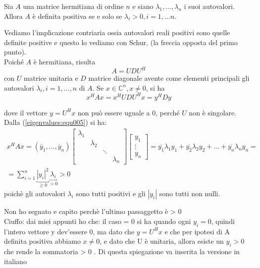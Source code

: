 \begin{theo}
\label{eigenvalues:theo006}
 Sia $A$ una matrice hermitiana di ordine $n$ e siano
$\lambda_1, \ldots, \lambda_n$ i suoi autovalori. Allora
$A$ \`e definita positiva se e solo se $\lambda_i > 0, i =1, \ldots n$.
\end{theo}
\begin{thproof}
Vediamo l'implicazione contriaria ossia
autovalori reali positivi sono quelle definite positive
e questo lo vediamo con Schur. (la freccia opposta del primo punto). \\
Poich\'e $A$  \`e hermitiana, risulta
$$ A = UDU^{H}$$ 
con $U$ matrice unitaria e $D$ matrice diagonale avente come elementi principali
gli autovalori $\lambda_i, i=1, \ldots,n$ di $A$. Se $x \in \mathbb{C}^{n}, x \neq 0$,
si ha
\begin{equation}
\label{eigenvalues:equ005}
x^{H} A x = x^{H}UDU^{H}x = y^{H}Dy 
\end{equation}

dove il vettore $y = U^{H}x$ non può essere uguale a $0$, perch\'e $U$
non \`e singolare. Dalla (\ref{eigenvalues:equ005}) si ha:
$$ 
\begin{array}{c}
x^{H}Ax = (\overline{y}_1, \ldots, \overline{y}_n)
 \left[
\begin{array}{cccc}
\lambda_1 & & &  \\
& \lambda_2 & &  \\
 & & \ddots &  \\
 & &  & \lambda_n 
\end{array}
\right]
\left[
\begin{array}{c}
y_1 \\
\vdots \\
y_n
\end{array}
\right]
 = \overline{y_{1}}\lambda_1 y_1 + \overline{y_{2}}\lambda_2 y_2 +
   \ldots + \overline{y_{n}}\lambda_n y_n = \\
 = \displaystyle \sum_{i=1}^{n} \underbracket{|y_i|^{2}}_{\geq 0} \underbracket{\lambda_{i}}_{>0}
 > 0
\end{array}
$$
poich\`e gli autovalori $\lambda_i$ sono tutti positivi e gli $|y_i|$
sono tutti non nulli.
\begin{notes} 

 Non ho segnato e capito perch\`e l'ultimo passaggetto \`e > 0 \\
Ciuffo: dai miei appunti ho che:  il caso = 0 si ha quando ogni $y_{i} = 0$,
quindi l'intero vettore y dev'essere 0, 
ma dato che $ y=U^{H}x $ e che per ipotesi di A definita positiva abbiamo
 $ x \neq 0 $, e dato che U \`e unitaria, 
allora esiste un $ y_i > 0 $ che rende la sommatoria > 0 .
Di questa spiegazione va inserita la versione in italiano
\end{notes}
\end{thproof}

